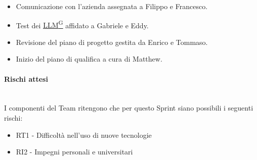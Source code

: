 \documentclass{article}
\begin{document}
\begin{itemize}
\begin{itemize}
                        \item Comunicazione con l'azienda assegnata a Filippo e Francesco.
                        \item Test dei \href{https://code7crusaders.github.io/docs/PB/documentazione_interna/glossario.html#llm-large-language-model}{LLM\textsuperscript{G}} affidato a Gabriele e Eddy.
                        \item Revisione del piano di progetto gestita da Enrico e Tommaso.
                        \item Inizio del piano di qualifica a cura di Matthew.
                    \end{itemize}
                \end{itemize}


                \paragraph{Rischi attesi}\mbox{}\\
                I componenti del Team ritengono che per questo Sprint siano possibili i seguenti rischi:
                \begin{itemize}
                    \item RT1 - Difficoltà nell’uso di nuove tecnologie
                    \item RI2 - Impegni personali e universitari
                \end{itemize}

\end{document}
